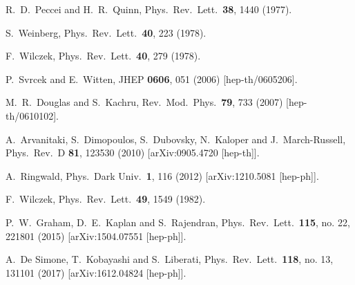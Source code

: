 \documentclass[11pt,nofootinbib]{article}
\numberwithin{equation}{section}
\begin{document}
 \begin{thebibliography}{99}
 
  R.~D.~Peccei and H.~R.~Quinn,
  Phys.\ Rev.\ Lett.\  {\bf 38}, 1440 (1977).

  S.~Weinberg,
  Phys.\ Rev.\ Lett.\  {\bf 40}, 223 (1978).

  F.~Wilczek,
  Phys.\ Rev.\ Lett.\  {\bf 40}, 279 (1978).
  
  P.~Svrcek and E.~Witten,
  JHEP {\bf 0606}, 051 (2006)
  [hep-th/0605206].

  M.~R.~Douglas and S.~Kachru,
  Rev.\ Mod.\ Phys.\  {\bf 79}, 733 (2007)
  [hep-th/0610102].
	
  A.~Arvanitaki, S.~Dimopoulos, S.~Dubovsky, N.~Kaloper and J.~March-Russell,
  Phys.\ Rev.\ D {\bf 81}, 123530 (2010)
  [arXiv:0905.4720 [hep-th]].	

  A.~Ringwald,
  Phys.\ Dark Univ.\  {\bf 1}, 116 (2012)
  [arXiv:1210.5081 [hep-ph]].
	
  F.~Wilczek,
  Phys.\ Rev.\ Lett.\  {\bf 49}, 1549 (1982).

  P.~W.~Graham, D.~E.~Kaplan and S.~Rajendran,
  Phys.\ Rev.\ Lett.\  {\bf 115}, no. 22, 221801 (2015)
  [arXiv:1504.07551 [hep-ph]].

  A.~De Simone, T.~Kobayashi and S.~Liberati,
  Phys.\ Rev.\ Lett.\  {\bf 118}, no. 13, 131101 (2017)
  [arXiv:1612.04824 [hep-ph]].


\end{thebibliography}
\end{document}
